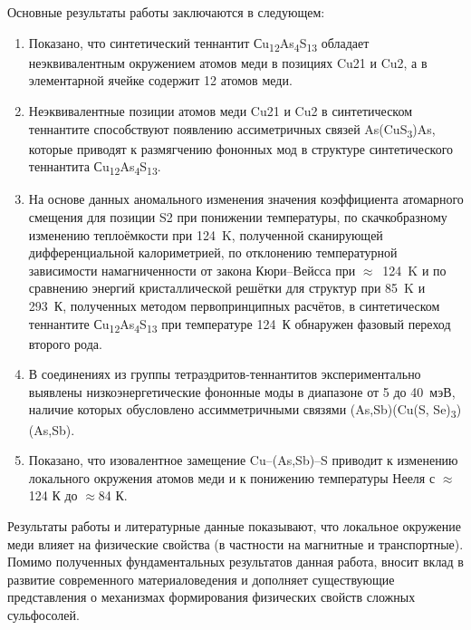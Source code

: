 Основные результаты работы заключаются в следующем:
% 
\begin{enumerate}
\item Показано, что синтетический теннантит Сu\textsubscript{12}As\textsubscript{4}S\textsubscript{13} обладает неэквивалентным  окружением атомов меди в позициях Cu21 и Cu2, а в элементарной ячейке содержит 12 атомов меди.
\item Неэквивалентные позиции атомов меди Cu21 и Cu2 в синтетическом теннантите способствуют появлению ассиметричных связей As(CuS\textsubscript{3})As, которые приводят к размягчению фононных мод в структуре синтетического теннантита Сu\textsubscript{12}As\textsubscript{4}S\textsubscript{13}.
\item На основе данных аномального изменения значения коэффициента атомарного смещения для позиции S2 при понижении температуры, по скачкобразному изменению теплоёмкости при 124~K, полученной сканирующей дифференциальной калориметрией, по отклонению температурной зависимости намагниченности от закона Кюри--Вейсса при $\approx$~124~K и по сравнению энергий кристаллической решётки для структур при 85~K и 293~К, полученных методом первопринципных расчётов, в синтетическом теннантите Сu\textsubscript{12}As\textsubscript{4}S\textsubscript{13} при температуре 124~К обнаружен фазовый переход второго рода.
\item В соединениях из группы тетраэдритов-теннантитов экспериментально выявлены низкоэнергетические фононные моды в диапазоне от 5 до 40~мэВ, наличие которых обусловлено  ассимметричными связями (As,Sb)(Cu(S, Se)\textsubscript{3})(As,Sb).
\item Показано, что изовалентное замещение Cu--(As,Sb)--S приводит к изменению локального окружения атомов меди и к понижению температуры Нееля с $\approx$124 К до $\approx$84 К.

\end{enumerate}

Результаты работы и литературные данные показывают, что локальное окружение меди влияет на физические свойства (в частности на магнитные и транспортные). Помимо полученных фундаментальных результатов данная работа, вносит вклад в развитие современного материаловедения и дополняет существующие представления о механизмах формирования физических свойств сложных сульфосолей.



